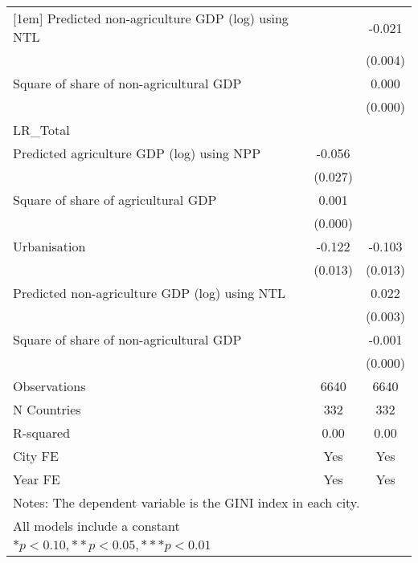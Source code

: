 {\begin{tabular}{l*{2}{c}}
[1em]
Predicted non-agriculture GDP (log) using NTL&                     &      -0.021\sym{***}\\
                    &                     &     (0.004)         \\
[1em]
Square of share of non-agricultural GDP&                     &       0.000\sym{**} \\
                    &                     &     (0.000)         \\
\hline
LR\_Total            &                     &                     \\
Predicted agriculture GDP (log) using NPP&      -0.056\sym{**} &                     \\
                    &     (0.027)         &                     \\
[1em]
Square of share of agricultural GDP&       0.001         &                     \\
                    &     (0.000)         &                     \\
[1em]
Urbanisation        &      -0.122\sym{***}&      -0.103\sym{***}\\
                    &     (0.013)         &     (0.013)         \\
[1em]
Predicted non-agriculture GDP (log) using NTL&                     &       0.022\sym{***}\\
                    &                     &     (0.003)         \\
[1em]
Square of share of non-agricultural GDP&                     &      -0.001\sym{***}\\
                    &                     &     (0.000)         \\
\hline
Observations        &        6640         &        6640         \\
N Countries         &         332         &         332         \\
R-squared           &        0.00         &        0.00         \\
City FE             &         Yes         &         Yes         \\
Year FE             &         Yes         &         Yes         \\
\hline\hline
\multicolumn{3}{l}{\footnotesize Notes: The dependent variable is the GINI index in each city.}\\
\multicolumn{3}{l}{\footnotesize All models include a constant}\\
\multicolumn{3}{l}{\footnotesize $* p<0.10, ** p<0.05, *** p<0.01$}\\
\end{tabular}
}
